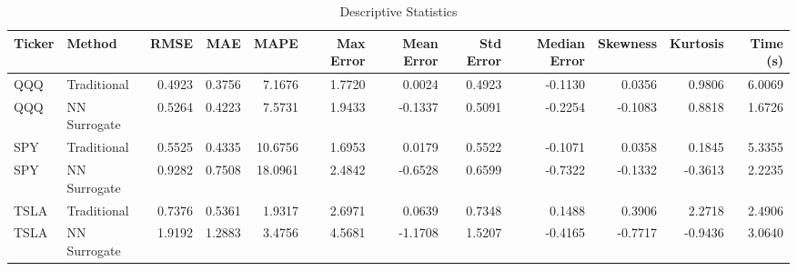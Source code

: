 \begin{table}
\caption{Descriptive Statistics}
\label{tab:descriptive_stats}
\begin{tabular}{llrrrrrrrrrr}
\toprule
Ticker & Method & RMSE & MAE & MAPE & Max Error & Mean Error & Std Error & Median Error & Skewness & Kurtosis & Time (s) \\
\midrule
QQQ & Traditional & 0.4923 & 0.3756 & 7.1676 & 1.7720 & 0.0024 & 0.4923 & -0.1130 & 0.0356 & 0.9806 & 6.0069 \\
QQQ & NN Surrogate & 0.5264 & 0.4223 & 7.5731 & 1.9433 & -0.1337 & 0.5091 & -0.2254 & -0.1083 & 0.8818 & 1.6726 \\
SPY & Traditional & 0.5525 & 0.4335 & 10.6756 & 1.6953 & 0.0179 & 0.5522 & -0.1071 & 0.0358 & 0.1845 & 5.3355 \\
SPY & NN Surrogate & 0.9282 & 0.7508 & 18.0961 & 2.4842 & -0.6528 & 0.6599 & -0.7322 & -0.1332 & -0.3613 & 2.2235 \\
TSLA & Traditional & 0.7376 & 0.5361 & 1.9317 & 2.6971 & 0.0639 & 0.7348 & 0.1488 & 0.3906 & 2.2718 & 2.4906 \\
TSLA & NN Surrogate & 1.9192 & 1.2883 & 3.4756 & 4.5681 & -1.1708 & 1.5207 & -0.4165 & -0.7717 & -0.9436 & 3.0640 \\
\bottomrule
\end{tabular}
\end{table}
